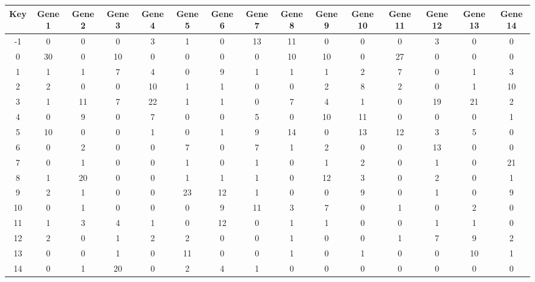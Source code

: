 \begin{tabular}{|c|c|c|c|c|c|c|c|c|c|c|c|c|c|c|}
\hline
Key & Gene 1 & Gene 2 & Gene 3 & Gene 4 & Gene 5 & Gene 6 & Gene 7 & Gene 8 & Gene 9 & Gene 10 & Gene 11 & Gene 12 & Gene 13 & Gene 14 \\
\hline
-1 & 0 & 0 & 0 & 3 & 1 & 0 & 13 & 11 & 0 & 0 & 0 & 3 & 0 & 0 \\
0 & 30 & 0 & 10 & 0 & 0 & 0 & 0 & 10 & 10 & 0 & 27 & 0 & 0 & 0 \\
1 & 1 & 1 & 7 & 4 & 0 & 9 & 1 & 1 & 1 & 2 & 7 & 0 & 1 & 3 \\
2 & 2 & 0 & 0 & 10 & 1 & 1 & 0 & 0 & 2 & 8 & 2 & 0 & 1 & 10 \\
3 & 1 & 11 & 7 & 22 & 1 & 1 & 0 & 7 & 4 & 1 & 0 & 19 & 21 & 2 \\
4 & 0 & 9 & 0 & 7 & 0 & 0 & 5 & 0 & 10 & 11 & 0 & 0 & 0 & 1 \\
5 & 10 & 0 & 0 & 1 & 0 & 1 & 9 & 14 & 0 & 13 & 12 & 3 & 5 & 0 \\
6 & 0 & 2 & 0 & 0 & 7 & 0 & 7 & 1 & 2 & 0 & 0 & 13 & 0 & 0 \\
7 & 0 & 1 & 0 & 0 & 1 & 0 & 1 & 0 & 1 & 2 & 0 & 1 & 0 & 21 \\
8 & 1 & 20 & 0 & 0 & 1 & 1 & 1 & 0 & 12 & 3 & 0 & 2 & 0 & 1 \\
9 & 2 & 1 & 0 & 0 & 23 & 12 & 1 & 0 & 0 & 9 & 0 & 1 & 0 & 9 \\
10 & 0 & 1 & 0 & 0 & 0 & 9 & 11 & 3 & 7 & 0 & 1 & 0 & 2 & 0 \\
11 & 1 & 3 & 4 & 1 & 0 & 12 & 0 & 1 & 1 & 0 & 0 & 1 & 1 & 0 \\
12 & 2 & 0 & 1 & 2 & 2 & 0 & 0 & 1 & 0 & 0 & 1 & 7 & 9 & 2 \\
13 & 0 & 0 & 1 & 0 & 11 & 0 & 0 & 1 & 0 & 1 & 0 & 0 & 10 & 1 \\
14 & 0 & 1 & 20 & 0 & 2 & 4 & 1 & 0 & 0 & 0 & 0 & 0 & 0 & 0 \\
\hline
\end{tabular}